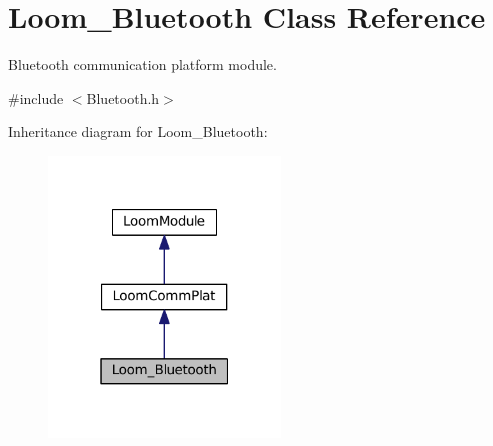 \hypertarget{class_loom___bluetooth}{}\section{Loom\+\_\+\+Bluetooth Class Reference}
\label{class_loom___bluetooth}


Bluetooth communication platform module.  




{\ttfamily \#include $<$Bluetooth.\+h$>$}



Inheritance diagram for Loom\+\_\+\+Bluetooth\+:\nopagebreak
\begin{figure}[H]
\begin{center}
\leavevmode
\includegraphics[width=175pt]{class_loom___bluetooth__inherit__graph}
\end{center}
\end{figure}
